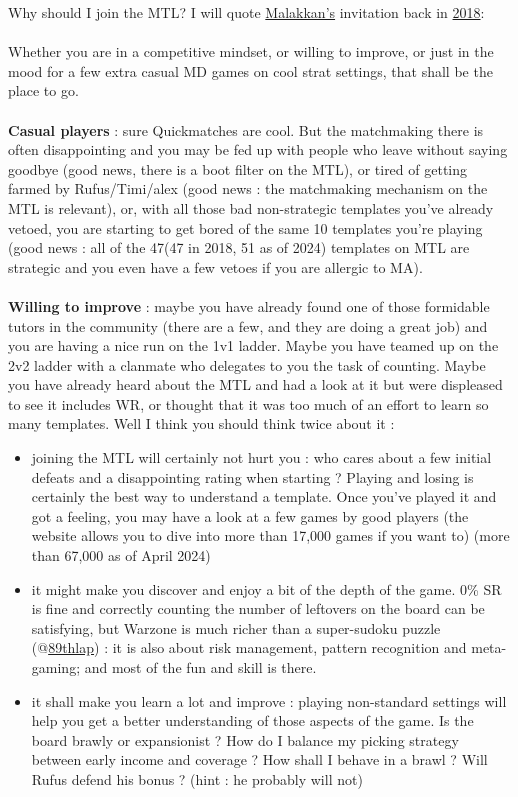 Why should I join the MTL? I will quote \href{https://www.warzone.com/Profile?p=257509174&u=malakkan_1}{Malakkan's} invitation back in \href{https://www.warzone.com/Forum/216823-multiday-ladder?Offset=888}{2018}:
\\
\\
Whether you are in a competitive mindset, or willing to improve, or just in the mood for a few extra casual MD games on cool strat settings, that shall be the place to go.
\\
\\
\textbf{Casual players} : sure Quickmatches are cool. But the matchmaking there is often disappointing and you may be fed up with people who leave without saying goodbye (good news, there is a boot filter on the MTL), or tired of getting farmed by Rufus/Timi/alex (good news : the matchmaking mechanism on the MTL is relevant), or, with all those bad non-strategic templates you've already vetoed, you are starting to get bored of the same 10 templates you're playing (good news : all of the 47(47 in 2018, 51 as of 2024) templates on MTL are strategic and you even have a few vetoes if you are allergic to MA).
\\
\\
\textbf{Willing to improve} : maybe you have already found one of those formidable tutors in the community (there are a few, and they are doing a great job) and you are having a nice run on the 1v1 ladder. Maybe you have teamed up on the 2v2 ladder with a clanmate who delegates to you the task of counting. Maybe you have already heard about the MTL and had a look at it but were displeased to see it includes WR, or thought that it was too much of an effort to learn so many templates. Well I think you should think twice about it :
\begin{itemize}
    \item joining the MTL will certainly not hurt you : who cares about a few initial defeats and a disappointing rating when starting ? Playing and losing is certainly the best way to understand a template. Once you've played it and got a feeling, you may have a look at a few games by good players (the website allows you to dive into more than 17,000 games if you want to) (more than 67,000 as of April 2024)
    \item it might make you discover and enjoy a bit of the depth of the game. 0\% SR is fine and correctly counting the number of leftovers on the board can be satisfying, but Warzone is much richer than a super-sudoku puzzle (@\href{https://www.warzone.com/Profile?p=1390562978&u=89thlap_1}{89thlap}) : it is also about risk management, pattern recognition and meta-gaming; and most of the fun and skill is there.
    \item it shall make you learn a lot and improve : playing non-standard settings will help you get a better understanding of those aspects of the game. Is the board brawly or expansionist ? How do I balance my picking strategy between early income and coverage ? How shall I behave in a brawl ? Will Rufus defend his bonus ? (hint : he probably will not)
\end{itemize}

